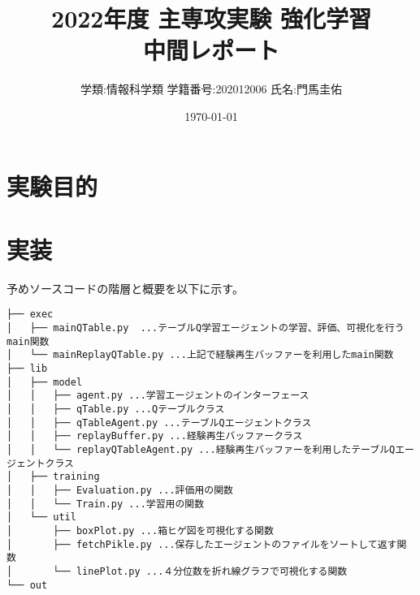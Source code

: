 \documentclass[a4paper,11pt]{jsarticle}
\begin{document}
\title{2022年度 主専攻実験 強化学習\\
  中間レポート}
\author{学類:情報科学類 学籍番号:202012006 氏名:門馬圭佑}
\date{\today}
\maketitle

\section{実験目的}



\section{実装}
予めソースコードの階層と概要を以下に示す。
\begin{verbatim}
├── exec
│   ├── mainQTable.py  ...テーブルQ学習エージェントの学習、評価、可視化を行うmain関数
│   └── mainReplayQTable.py ...上記で経験再生バッファーを利用したmain関数
├── lib
│   ├── model
│   │   ├── agent.py ...学習エージェントのインターフェース
│   │   ├── qTable.py ...Qテーブルクラス
│   │   ├── qTableAgent.py ...テーブルQエージェントクラス
│   │   ├── replayBuffer.py ...経験再生バッファークラス
│   │   └── replayQTableAgent.py ...経験再生バッファーを利用したテーブルQエージェントクラス
│   ├── training
│   │   ├── Evaluation.py ...評価用の関数
│   │   └── Train.py ...学習用の関数
│   └── util
│       ├── boxPlot.py ...箱ヒゲ図を可視化する関数
│       ├── fetchPikle.py ...保存したエージェントのファイルをソートして返す関数
│       └── linePlot.py ...４分位数を折れ線グラフで可視化する関数
└── out
\end{verbatim}
\end{document}
